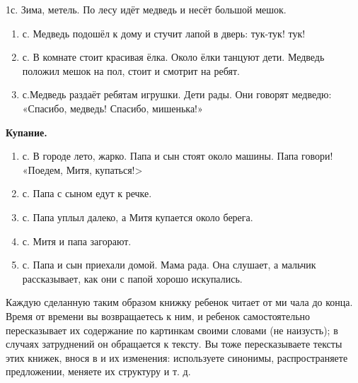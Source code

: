 \documentclass{book}
\begin{document}
1с. Зима, метель. По лесу идёт медведь и несёт большой мешок.


\begin{enumerate}
\def\labelenumi{\arabic{enumi}.}
\setcounter{enumi}{1}
\item
  
  с. Медведь подошёл к дому и стучит лапой в дверь: тук-тук! тук!
  
\item
  
  с. В комнате стоит красивая ёлка. Около ёлки танцуют дети. Медведь
  положил мешок на пол, стоит и смотрит на ребят.
  
\item
  
  с.Медведь раздаёт ребятам игрушки. Дети рады. Они говорят медведю:
  «Спасибо, медведь! Спасибо, мишенька!»
  
\end{enumerate}


\textbf{Купание.}


\begin{enumerate}
\def\labelenumi{\arabic{enumi}.}
\item
  
  с. В городе лето, жарко. Папа и сын стоят около машины. Папа говори!\\
  «Поедем, Митя, купаться!\textgreater{}
  
\item
  
  с. Папа с сыном едут к речке.
  
\item
  
  с. Папа уплыл далеко, а Митя купается около берега.
  
\item
  
  с. Митя и папа загорают.
  
\item
  
  с. Папа и сын приехали домой. Мама рада. Она слушает, а мальчик
  рассказывает, как они с папой хорошо искупались.
  
\end{enumerate}


Каждую сделанную таким образом книжку ребенок читает от ми чала до
конца. Время от времени вы возвращаетесь к ним, и ребенок самостоятельно
пересказывает их содержание по картинкам своими словами (не наизусть); в
случаях затруднений он обращается к тексту. Вы тоже пересказываете
тексты этих книжек, внося в и их изменения: используете синонимы,
распространяете предложении, меняете их структуру и т. д.
\end{document}
